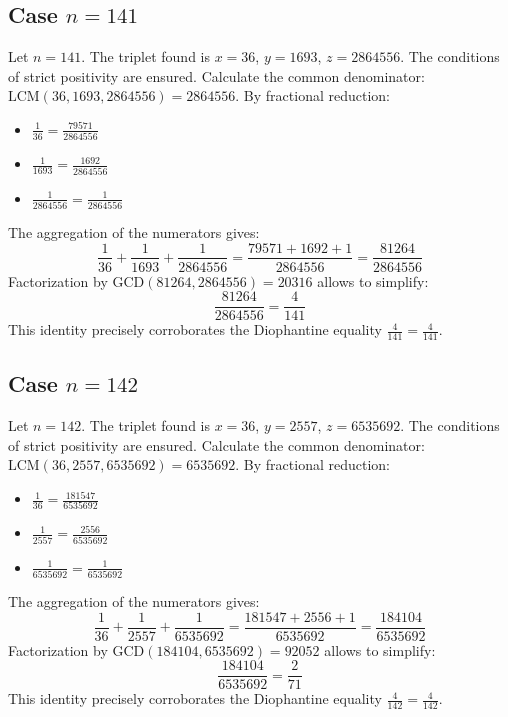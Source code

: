\documentclass[11pt,a4paper]{article}
\begin{document}
\subsection{Case $n = 141$}
Let $n = 141$. The triplet found is $x = 36$, $y = 1693$, $z = 2864556$.
The conditions of strict positivity are ensured.
Calculate the common denominator: $\text{LCM}(36, 1693, 2864556) = 2864556$.
By fractional reduction:
\begin{itemize}
    \item $\frac{1}{36} = \frac{79571}{2864556}$
    \item $\frac{1}{1693} = \frac{1692}{2864556}$
    \item $\frac{1}{2864556} = \frac{1}{2864556}$
\end{itemize}
The aggregation of the numerators gives:
$$ \frac{1}{36} + \frac{1}{1693} + \frac{1}{2864556} = \frac{79571 + 1692 + 1}{2864556} = \frac{81264}{2864556} $$
Factorization by $\text{GCD}(81264, 2864556) = 20316$ allows to simplify:
$$ \frac{81264}{2864556} = \frac{4}{141} $$
This identity precisely corroborates the Diophantine equality $\frac{4}{141} = \frac{4}{141}$.

\subsection{Case $n = 142$}
Let $n = 142$. The triplet found is $x = 36$, $y = 2557$, $z = 6535692$.
The conditions of strict positivity are ensured.
Calculate the common denominator: $\text{LCM}(36, 2557, 6535692) = 6535692$.
By fractional reduction:
\begin{itemize}
    \item $\frac{1}{36} = \frac{181547}{6535692}$
    \item $\frac{1}{2557} = \frac{2556}{6535692}$
    \item $\frac{1}{6535692} = \frac{1}{6535692}$
\end{itemize}
The aggregation of the numerators gives:
$$ \frac{1}{36} + \frac{1}{2557} + \frac{1}{6535692} = \frac{181547 + 2556 + 1}{6535692} = \frac{184104}{6535692} $$
Factorization by $\text{GCD}(184104, 6535692) = 92052$ allows to simplify:
$$ \frac{184104}{6535692} = \frac{2}{71} $$
This identity precisely corroborates the Diophantine equality $\frac{4}{142} = \frac{4}{142}$.
\end{document}
